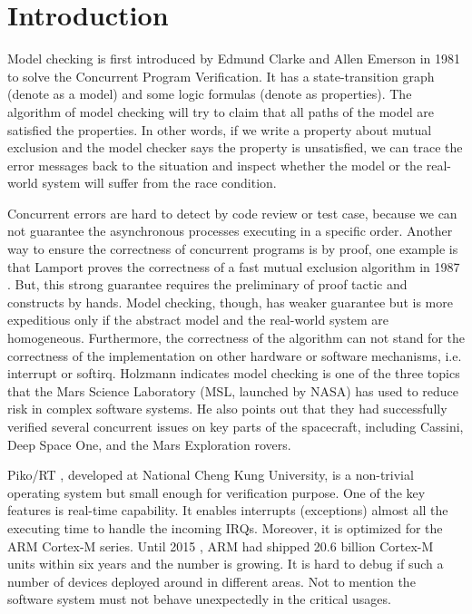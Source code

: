 \section{Introduction}
Model checking \cite{Clark:2000, Clarke:2008:BMC:1423535.1423536} is first introduced by Edmund Clarke and Allen Emerson in 1981 to solve the Concurrent Program Verification. It has a state-transition graph (denote as a model) and some logic formulas (denote as properties). The algorithm of model checking will try to claim that all paths of the model are satisfied the properties. In other words, if we write a property about mutual exclusion and the model checker says the property is unsatisfied, we can trace the error messages back to the situation and inspect whether the model or the real-world system will suffer from the race condition.

Concurrent errors are hard to detect by code review or test case, because we can not guarantee the asynchronous processes executing in a specific order. Another way to ensure the correctness of concurrent programs is by proof, one example is that Lamport proves the correctness of a fast mutual exclusion algorithm in 1987 \cite{Lamport:1987:FME:7351.7352}. But, this strong guarantee requires the preliminary of proof tactic and constructs by hands. Model checking, though, has weaker guarantee but is more expeditious only if the abstract model and the real-world system are homogeneous. Furthermore, the correctness of the algorithm can not stand for the correctness of the implementation on other hardware or software mechanisms, i.e. interrupt or softirq. Holzmann \cite{Holzmann:2014:MC:2556647.2560218} indicates model checking is one of the three topics that the Mars Science Laboratory (MSL, launched by NASA) has used to reduce risk in complex software systems. He also points out that they had successfully verified several concurrent issues on key parts of the spacecraft, including Cassini, Deep Space One, and the Mars Exploration rovers.

Piko/RT \cite{PikoRT}, developed at National Cheng Kung University, is a non-trivial operating system but small enough for verification purpose. One of the key features is real-time capability. It enables interrupts (exceptions) almost all the executing time to handle the incoming IRQs. Moreover, it is optimized for the ARM Cortex-M series. Until 2015 \cite{ARMProduct}, ARM had shipped 20.6 billion Cortex-M units within six years and the number is growing. It is hard to debug if such a number of devices deployed around in different areas. Not to mention the software system must not behave unexpectedly in the critical usages.

